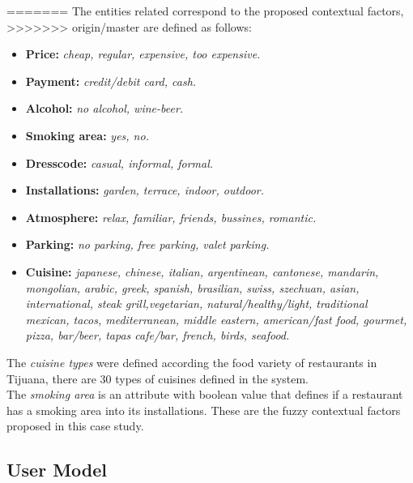 =======
The entities related correspond to the proposed contextual factors, 
>>>>>>> origin/master
are defined as follows: 
\begin{itemize}
\item \textbf{Price:} \textit{cheap, regular, expensive, too expensive.}
\item \textbf{Payment:} \textit{credit/debit card, cash.}
\item \textbf{Alcohol:} \textit{no alcohol, wine-beer.}
\item \textbf{Smoking area:} \textit{yes, no.}
\item \textbf{Dresscode:} \textit{casual, informal, formal.}
\item \textbf{Installations:} \textit{garden, terrace, indoor, outdoor.}
\item \textbf{Atmosphere:} \textit{relax, familiar, friends, bussines, romantic.}
\item \textbf{Parking:} \textit{no parking, free parking, valet parking.}
\item \textbf{Cuisine:} \textit{japanese, chinese, italian, argentinean,
cantonese, mandarin, mongolian, arabic, greek, spanish, brasilian,
swiss, szechuan, asian, international, steak grill,vegetarian,
natural/healthy/light, traditional mexican, tacos, mediterranean,
middle eastern, american/fast food, gourmet, pizza, bar/beer, tapas
cafe/bar, french, birds, seafood.}
\end{itemize}
The \textit{cuisine types} were defined according the food variety 
of restaurants in Tijuana, there are 30 types of cuisines defined 
in the system. \\
The \textit{smoking area} is an attribute with boolean value that 
defines if a restaurant has a smoking area into its installations.
These are the fuzzy contextual factors proposed in this case study.

\subsection{User Model} 

